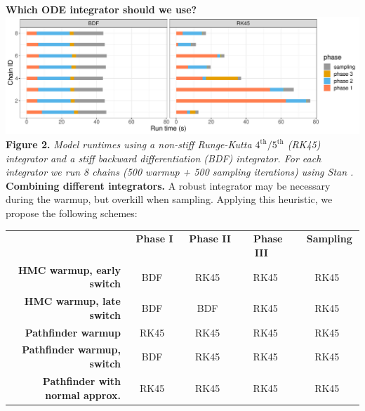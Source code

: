 \documentclass[21pt, custom, portrait, plainboxedsections]{sciposter}
\begin{document}
\begin{multicols}{3}
\textbf{Which ODE integrator should we use?} \\

\includegraphics[width = 14.5in]{../figures/phase_time_facet_4x12.pdf}
\textbf{Figure 2.} \textit{Model runtimes using a non-stiff Runge-Kutta $4^\text{th}/5^\text{th}$ (RK45) integrator and a stiff backward differentiation (BDF) integrator.
For each integrator we run 8 chains (500 warmup + 500 sampling iterations) using Stan \cite{Carpenter:2017}.} \\


\textbf{Combining different integrators.} A robust integrator may be necessary during the warmup, but overkill when sampling.
Applying this heuristic, we propose the following schemes:

\begin{center}
\renewcommand{\arraystretch}{1.5}
\begin{tabular}{r c c c c}
  & \ \textbf{Phase I} \ & \ \textbf{Phase II} \ \ & \ \textbf{Phase III} \ & \ \textbf{Sampling} \ \\
  \textbf{HMC warmup, early switch} & \cellcolor{Melon} BDF & \cellcolor{SkyBlue} RK45 & \cellcolor{SkyBlue} RK45 & \cellcolor{SkyBlue} RK45 \\
  \textbf{HMC warmup, late switch} & \cellcolor{Melon} BDF & \cellcolor{Melon} BDF &  \cellcolor{SkyBlue} RK45 & \cellcolor{SkyBlue} RK45 \\
  \hline
  \textbf{Pathfinder warmup}  &\cellcolor{SkyBlue} RK45 & \cellcolor{SkyBlue} RK45 & \cellcolor{SkyBlue} RK45 & \cellcolor{SkyBlue} RK45 \\
  \textbf{Pathfinder warmup, switch} & \cellcolor{Melon} BDF & \cellcolor{SkyBlue} RK45 & \cellcolor{SkyBlue} RK45 & \cellcolor{SkyBlue} RK45 \\
  \textbf{Pathfinder with normal approx.} & \cellcolor{SkyBlue} RK45 & \cellcolor{SkyBlue} RK45 & \cellcolor{SkyBlue} RK45 & \cellcolor{SkyBlue} RK45
\end{tabular}
\end{center}


\end{multicols}
\end{document}
